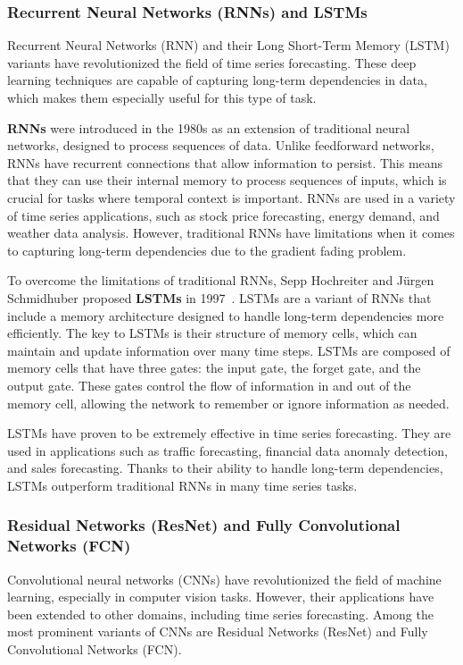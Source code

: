 \subsubsection{Recurrent Neural Networks (RNNs) and LSTMs}
Recurrent Neural Networks (RNN) and their Long Short-Term Memory (LSTM) variants have revolutionized the field of time series forecasting. These deep learning techniques are capable of capturing long-term dependencies in data, which makes them especially useful for this type of task.
\vspace{10pt}

\textbf{RNNs} were introduced in the 1980s as an extension of traditional neural networks, designed to process sequences of data. Unlike feedforward networks, RNNs have recurrent connections that allow information to persist. This means that they can use their internal memory to process sequences of inputs, which is crucial for tasks where temporal context is important.
RNNs are used in a variety of time series applications, such as stock price forecasting, energy demand, and weather data analysis. However, traditional RNNs have limitations when it comes to capturing long-term dependencies due to the gradient fading problem.
\vspace{10pt}

To overcome the limitations of traditional RNNs, Sepp Hochreiter and Jürgen Schmidhuber proposed \textbf{LSTMs} in 1997~\cite{LSTM}. LSTMs are a variant of RNNs that include a memory architecture designed to handle long-term dependencies more efficiently. The key to LSTMs is their structure of memory cells, which can maintain and update information over many time steps. LSTMs are composed of memory cells that have three gates: the input gate, the forget gate, and the output gate. These gates control the flow of information in and out of the memory cell, allowing the network to remember or ignore information as needed.

LSTMs have proven to be extremely effective in time series forecasting. They are used in applications such as traffic forecasting, financial data anomaly detection, and sales forecasting. Thanks to their ability to handle long-term dependencies, LSTMs outperform traditional RNNs in many time series tasks.
\vspace{10pt}

\subsubsection{Residual Networks (ResNet) and Fully Convolutional Networks (FCN)}
Convolutional neural networks (CNNs) have revolutionized the field of machine learning, especially in computer vision tasks. However, their applications have been extended to other domains, including time series forecasting. Among the most prominent variants of CNNs are Residual Networks (ResNet) and Fully Convolutional Networks (FCN).

